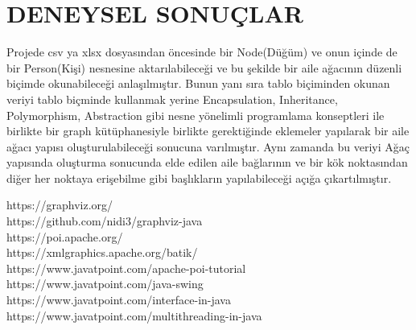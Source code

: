 \documentclass[conference]{IEEEtran}
\begin{document}
\section{\textbf{DENEYSEL SONUÇLAR}}
    Projede csv ya xlsx dosyasından öncesinde bir Node(Düğüm) ve onun içinde de bir Person(Kişi) nesnesine aktarılabileceği ve bu şekilde bir aile ağacının düzenli biçimde okunabileceği anlaşılmıştır. Bunun yanı sıra tablo biçiminden okunan veriyi tablo biçminde kullanmak yerine Encapsulation, Inheritance, Polymorphism, Abstraction gibi nesne yönelimli programlama konseptleri ile birlikte bir graph kütüphanesiyle birlikte gerektiğinde eklemeler yapılarak bir aile ağacı yapısı oluşturulabileceği sonucuna varılmıştır. Aynı zamanda bu veriyi Ağaç yapısında oluşturma sonucunda elde edilen aile bağlarının ve  bir kök noktasından diğer her noktaya erişebilme gibi başlıkların yapılabileceği açığa çıkartılmıştır.



\begin{thebibliography}{}
https://graphviz.org/\\
https://github.com/nidi3/graphviz-java\\
https://poi.apache.org/\\
https://xmlgraphics.apache.org/batik/\\
https://www.javatpoint.com/apache-poi-tutorial\\
https://www.javatpoint.com/java-swing\\
https://www.javatpoint.com/interface-in-java\\
https://www.javatpoint.com/multithreading-in-java\\
\end{thebibliography}
\end{document}
